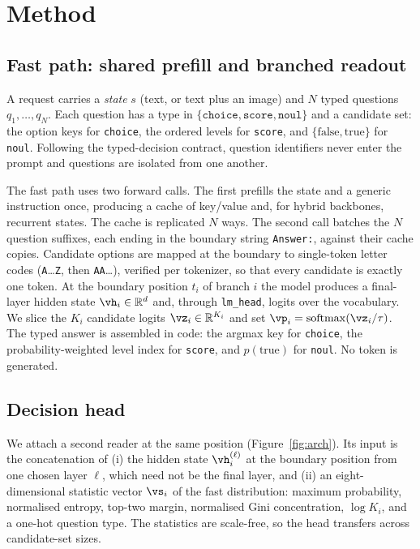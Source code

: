 \documentclass{article}
\begin{document}
\section{Method}
\label{sec:method}

\subsection{Fast path: shared prefill and branched readout}
\label{sec:fast}

A request carries a \emph{state} $s$ (text, or text plus an image) and $N$ typed questions $q_1,\dots,q_N$. Each question has a type in $\{\texttt{choice},\texttt{score},\texttt{noul}\}$ and a candidate set: the option keys for \texttt{choice}, the ordered levels for \texttt{score}, and $\{\text{false},\text{true}\}$ for \texttt{noul}. Following the typed-decision contract, question identifiers never enter the prompt and questions are isolated from one another.

The fast path uses two forward calls. The first prefills the state and a generic instruction once, producing a cache of key/value and, for hybrid backbones, recurrent states. The cache is replicated $N$ ways. The second call batches the $N$ question suffixes, each ending in the boundary string \texttt{Answer:}, against their cache copies. Candidate options are mapped at the boundary to single-token letter codes (\texttt{A}\dots\texttt{Z}, then \texttt{AA}\dots), verified per tokenizer, so that every candidate is exactly one token. At the boundary position $t_i$ of branch $i$ the model produces a final-layer hidden state $\vh_i\in\mathbb{R}^d$ and, through \texttt{lm\_head}, logits over the vocabulary. We slice the $K_i$ candidate logits $\vz_i\in\mathbb{R}^{K_i}$ and set $\vp_i=\mathrm{softmax}(\vz_i/\tau)$. The typed answer is assembled in code: the argmax key for \texttt{choice}, the probability-weighted level index for \texttt{score}, and $p(\text{true})$ for \texttt{noul}. No token is generated.

\subsection{Decision head}
\label{sec:head}

We attach a second reader at the same position (Figure~\ref{fig:arch}). Its input is the concatenation of (i) the hidden state $\vh_i^{(\ell)}$ at the boundary position from one chosen layer $\ell$, which need not be the final layer, and (ii) an eight-dimensional statistic vector $\vs_i$ of the fast distribution: maximum probability, normalised entropy, top-two margin, normalised Gini concentration, $\log K_i$, and a one-hot question type. The statistics are scale-free, so the head transfers across candidate-set sizes.
\end{document}
